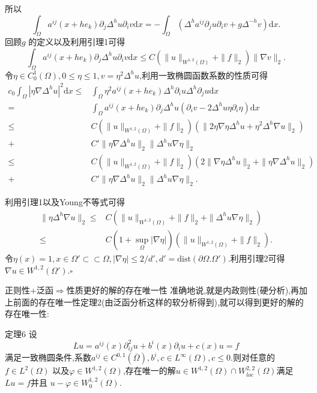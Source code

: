 \begin{frame}[t]
  所以
  \[
    \int_{\Omega}a^{ij}(x+he_k)\partial_j\Delta^{h}u\partial_i v \mathrm{d}x=-\int_{\Omega} \left(\Delta^{h}a^{ij}\partial_j u \partial_i v +g\Delta^{-h}v\right)\mathrm{d}x.
  \]
  回顾$g$ 的定义以及利用引理1可得
  \[
    \int_{\Omega}a^{ij}(x+he_k)\partial_j\Delta^{h}u\partial_iv \mathrm{d}x\le C \left( \|u\|_{W^{1,2}(\Omega)}+\|f\|_2 \right) \|\nabla v\|_2.
  \]
  令$\eta \in C_0^{1}(\Omega),0\le\eta \le 1,v=\eta^2\Delta^{h}u$,利用一致椭圆函数系数的性质可得
\begin{align*}
  c_0 \int_{\Omega}|\eta \nabla \Delta^{h}u|^2\mathrm{d}x\le & \int_{\Omega}\eta^2a^{ij}(x+he_k)\Delta^{h}\partial_i u \Delta^{h}\partial_j u \mathrm{d}x\\
  = & \int_{\Omega}a^{ij}(x+he_k)\partial_j\Delta^{h}u(\partial_i v-2\Delta^{h} u \eta\partial_i\eta)\mathrm{d}x\\
  \le & C\left( \|u\|_{W^{1,2}(\Omega)}+\|f\|_2 \right) \left(\|2 \eta \nabla \eta\Delta^{h}u+\eta^2\Delta^{h}\nabla u\|_2 \right) \\
  +& C' \|\eta \nabla  \Delta^{h}u\|_2\|\Delta^{h}u \nabla \eta\|_2\\
  \le & C\left( \|u\|_{W^{1,2}(\Omega)}+\|f\|_2 \right) \left(2 \|\nabla \eta \Delta^{h}u \|_2+\|\eta \nabla  \Delta^{h}u\|_2 \right)\\
  +& C' \|\eta\nabla \Delta^{h}u\|_2\|\Delta^{h}u\nabla \eta\|_2
.\end{align*}
\end{frame}
\begin{frame}[t]
  利用引理1以及Young不等式可得
  \begin{align*}
    \|\eta \Delta^{h}\nabla u\|_2\le & C\left(\|u\|_{W^{1,2}(\Omega)}+\|f\|_2+\|\Delta^{h}u\nabla \eta\|_2  \right)\\
    \le & C\left( 1+\sup_{\Omega}|\nabla \eta| \right) \left( \|u\|_{W^{1,2}(\Omega)}+\|f\|_2 \right) .
  \end{align*}
  令$\eta(x)=1,x\in \Omega'\subset \subset \Omega,|\nabla \eta|\le 2 / d',d'=\mathrm{dist}(\partial\Omega.\Omega')$.利用引理2可得 $\nabla u \in W^{1,2}(\Omega')$.\hfill $\square$\par

\end{frame}
\begin{frame}[t]{正则性+泛函$\Rightarrow$性质更好的解的存在唯一性}
准确地说,就是内政则性(硬分析),再加上前面的存在唯一性定理2(由泛函分析这样的软分析得到),就可以得到更好的解的存在唯一性:
\begin{alertblock}{定理6}
  设
  \[
    Lu=a^{ij}(x)\partial^2_{ij}u+b^{i}(x)\partial_i u+c(x)u=f
  \] 
 满足一致椭圆条件,系数$a^{ij}\in C^{0,1}(\overline{\Omega}),b^{i},c\in L^{\infty}(\Omega),c\le 0$.则对任意的$f\in L^{2}(\Omega)$ 以及$\varphi \in W^{1,2}(\Omega)$,存在唯一的解$u\in W^{1,2}(\Omega)\cap W^{2,2}_{loc}(\Omega)$满足$Lu=f$并且 $u-\varphi \in W_0^{1,2}(\Omega)$.
\end{alertblock}
\end{frame}
